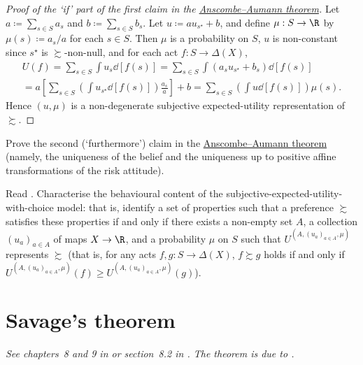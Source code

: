 \begin{proof}[Proof of the `if' part of the first claim in the {\hyperref[theorem:aa]{Anscombe--Aumann theorem}}]
	Let $a \coloneqq \sum_{s \in S} a_s$ and $b \coloneqq \sum_{s \in S} b_s$. Let $u \coloneqq a u_{s^\star} + b$, and define $\mu : S \to \R$ by $\mu(s) \coloneqq a_s/a$ for each $s \in S$. Then $\mu$ is a probability on $S$, $u$ is non-constant since $s^\star$ is $\succsim$-non-null, and for each act $f : S \to \Delta(X)$,
	\begin{multline*}
		U(f)
		= \sum_{s \in S} \int u_s \dd[f(s)]
		= \sum_{s \in S} \int (a_s u_{s^\star} + b_s) \dd[f(s)]
		\\
		= a \left[ \sum_{s \in S} \left( \int  u_{s^\star} \dd[f(s)] \right) \frac{a_s}{a} \right] + b
		= \sum_{s \in S} \left( \int u \dd[f(s)] \right) \mu(s) .
	\end{multline*}
	Hence $(u,\mu)$ is a non-degenerate subjective expected-utility representation of $\succsim$.
\end{proof}

\begin{exercise}
	\label{exercise:aa_uniqueness}
	Prove the second (`furthermore') claim in the \hyperref[theorem:aa]{Anscombe--Aumann theorem} (namely, the uniqueness of the belief and the uniqueness up to positive affine transformations of the risk attitude).
\end{exercise}

\begin{namedthm}
	\label{exercise:mh_axioms}
	Read \textcite{MaccheroniMarinacciRustichini2006}. Characterise the behavioural content of the subjective-expected-utility-with-choice model: that is, identify a set of properties such that a preference $\succsim$ satisfies these properties if and only if there exists a non-empty set $A$, a collection $(u_a)_{a \in A}$ of maps $X \to \R$, and a probability $\mu$ on $S$ such that $U^{(A,(u_a)_{a \in A},\mu)}$ represents $\succsim$ (that is, for any acts $f,g : S \to \Delta(X)$, $f \succsim g$ holds if and only if $U^{(A,(u_a)_{a \in A},\mu)}(f) \geq U^{(A,(u_a)_{a \in A},\mu)}(g)$).
\end{namedthm}



\section[Savage's theorem \emph{(not yet written)}]{Savage's theorem}
\label{ambi:savage}

\emph{See chapters~8 and 9 in \textcite{Kreps1988} or section~8.2 in \textcite{Strzalecki2023}. The theorem is due to \textcite{Savage1954}.}
